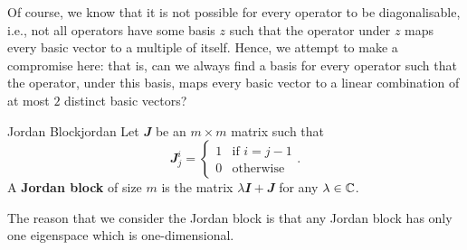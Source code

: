 \documentclass[math, code]{amznotes}
\theoremstyle{remark}
\begin{document}
Of course, we know that it is not possible for every operator to be diagonalisable, i.e., not all operators have some basis $z$ such that the operator under $z$ maps every basic vector to a multiple of itself. Hence, we attempt to make a compromise here: that is, can we always find a basis for every operator such that the operator, under this basis, maps every basic vector to a linear combination of at most $2$ distinct basic vectors?
\begin{dfnbox}{Jordan Block}{jordan}
    Let $\mathbfit{J}$ be an $m \times m$ matrix such that 
    \begin{equation*}
        \mathbfit{J}^i_j = \begin{cases}
            1 & \textrm{if } i = j - 1 \\
            0 & \textrm{otherwise}
        \end{cases}.
    \end{equation*}
    A {\color{red} \textbf{Jordan block}} of size $m$ is the matrix $\lambda\mathbfit{I} + \mathbfit{J}$ for any $\lambda \in \mathbb{C}$.
\end{dfnbox}
The reason that we consider the Jordan block is that any Jordan block has only one eigenspace which is one-dimensional.
\end{document}
